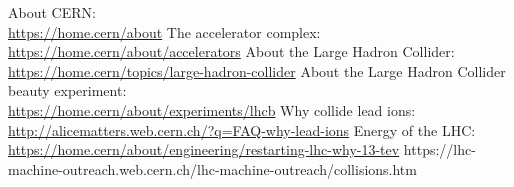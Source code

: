 \documentclass[12pt]{article}
\begin{document}
	\begin{thebibliography}{asd}
		 About CERN: \\
			\url{https://home.cern/about}
		 The accelerator complex: \\
			\url{https://home.cern/about/accelerators}
		 About the Large Hadron Collider: \\
			\url{https://home.cern/topics/large-hadron-collider}
		 About the Large Hadron Collider beauty experiment: \\
			\url{https://home.cern/about/experiments/lhcb}
		 Why collide lead ions: \\
			\url{http://alicematters.web.cern.ch/?q=FAQ-why-lead-ions}
		 Energy of the LHC: \\
			\url{https://home.cern/about/engineering/restarting-lhc-why-13-tev}
		 https://lhc-machine-outreach.web.cern.ch/lhc-machine-outreach/collisions.htm
	\end{thebibliography}
\end{document}
